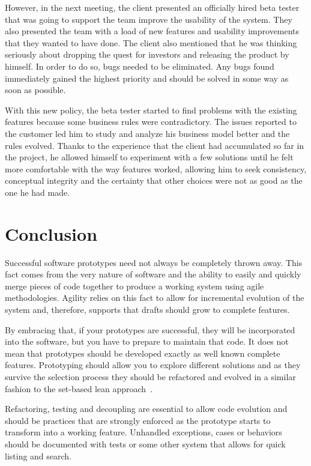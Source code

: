 \documentclass[lnbip]{svmultln}
\begin{document}
However, in the next meeting, the client presented an officially hired
beta tester that was going to support the team improve the usability
of the system. They also presented the team with a load of new
features and usability improvements that they wanted to have done. The
client also mentioned that he was thinking seriously about dropping
the quest for investors and releasing the product by himself. In order
to do so, bugs needed to be eliminated. Any bugs found immediately
gained the highest priority and should be solved in some way as soon
as possible.

With this new policy, the beta tester started to find problems with the
existing features because some business rules were contradictory. The issues reported
to the customer led him to study and analyze his business model
better and the rules evolved. Thanks to the experience that the client
had accumulated so far in the project, he allowed himself to
experiment with a few solutions until he felt more comfortable with the way
features worked, allowing him to seek consistency, conceptual
integrity and the certainty that other choices were not as good as the
one he had made.

\section{Conclusion}
\label{sec:conclusion}

Successful software prototypes need not always be completely thrown
away. This fact comes from the very nature of software and the ability
to easily and quickly merge pieces of code together to produce a
working system using agile methodologies. Agility relies on this fact to allow for incremental
evolution of the system and, therefore, supports that drafts should
grow to complete features.

By embracing that, if your prototypes are successful, they will be
incorporated into the software, but you have to prepare to maintain that
code. It does not mean that prototypes should be developed exactly
as well known complete features. Prototyping should allow you to
explore different solutions and as they survive
the selection process they should be refactored and evolved in a similar fashion to the set-based lean approach~\cite{Poppendieck2009}.

Refactoring, testing and decoupling are essential to allow code
evolution and should be practices that are strongly enforced as the prototype 
starts to transform into a working feature. 
Unhandled exceptions, cases or behaviors should be
documented with tests or some other system that allows for
quick listing and search.
\end{document}
